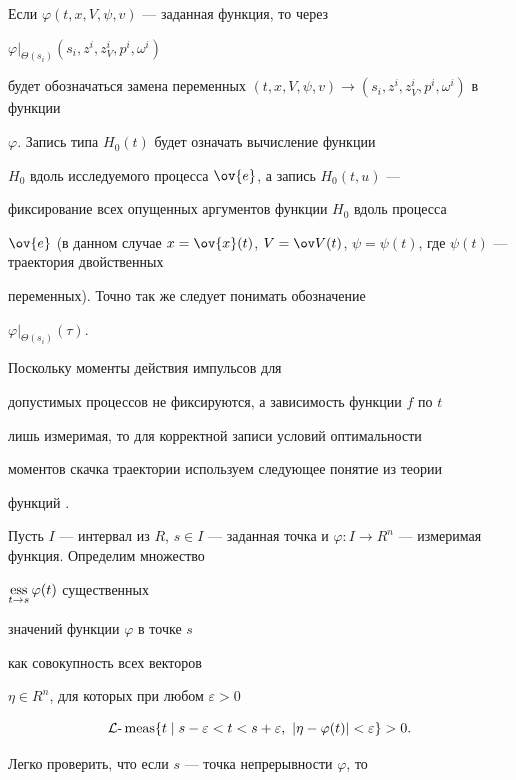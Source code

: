 Если $\varphi (t,x,V,\psi,v)$ --- заданная функция, то через


$\varphi|_{\Theta(s_i)}(s_i,z^i,z_V^i,p^i,\omega^i)$


будет обозначаться замена переменных $(t,x, V,\psi,v)


\rightarrow (s_i,z^i,z_V^i,p^i,\omega^i)$ в функции


$\varphi$. Запись типа $H_0(t)$ будет означать вычисление функции


$H_0$ вдоль исследуемого процесса $\ov{e}$, а запись $H_0(t,u)$ ---


фиксирование всех опущенных аргументов функции $H_0$ вдоль процесса


$\ov{e}$ (в данном случае $x=\ov{x}(t)$, $V=\ov


V(t)$, $\psi=\psi(t)$, где $\psi(t)$ --- траектория двойственных


переменных). Точно так же следует понимать обозначение


$\varphi|_{\Theta(s_i)}(\tau)$.





Поскольку моменты действия импульсов для


допустимых процессов не фиксируются, а зависимость функции $f$ по $t$


лишь измеримая, то для корректной записи условий оптимальности


моментов скачка траектории используем следующее понятие из теории


функций \cite{Clarke.Vinter}.





Пусть $I$ --- интервал из $R$, $s \in I$ --- заданная точка и $\varphi: I


\rightarrow R^n$ --- измеримая функция. Определим множество


$\ess\limits_{t \rightarrow s}\varphi (t)$ существенных


значений функции $\varphi$ в точке $s$


как совокупность всех векторов


$\eta\in R^n$, для которых при любом $\varepsilon > 0$


$$


{\cal L}\text{-}\meas\{t\mid s-\varepsilon <t< s+\varepsilon,\


|\eta-\varphi(t)|< \varepsilon \}>0.


$$


Легко проверить, что если $s$ --- точка непрерывности $\varphi$, то


